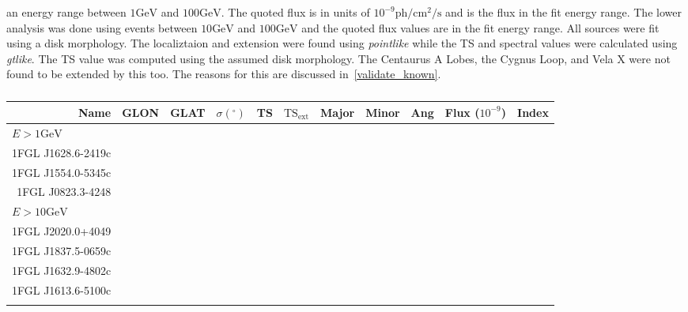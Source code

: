 \documentclass[preprint]{aastex}
\newcommand{\gev}{\text{GeV}\xspace}
\newcommand{\s}{\text{s}\xspace}
\newcommand{\ph}{\text{ph}\xspace}
\newcommand{\cm}{\text{cm}\xspace}
\newcommand{\tsext}{\ensuremath{\text{TS}_\text{ext}}\xspace}
\newcommand{\pointlike}{{\em pointlike}\xspace}
\newcommand{\gtlike}{{\em gtlike}\xspace}
\begin{document}
\begin{table}
\begin{centering}
{      an energy range between $1\gev$ and $100\gev$.
      The quoted flux is in units of $10^{-9}\ph/\cm^2/\s$ and 
      is the flux in the fit energy range.
      The lower analysis was done using events between
      $10\gev$ and $100\gev$ and the quoted flux
      values are in the fit energy range. All sources were
      fit using a disk morphology. The localiztaion and extension
      were found using \pointlike while the TS and spectral
      values were calculated using \gtlike.
      The TS value was computed using 
      the assumed disk morphology. The Centaurus A Lobes,
      the Cygnus Loop, and Vela X were not found to be extended by
      this too. The reasons for this are discussed in~\ref{validate_known}.
      }
    \end{centering}
\end{table}


\clearpage

\begin{table}
    \begin{centering}
      \begin{tabular}{rrrrrrrrrrr}
        Name           &    GLON &    GLAT & $\sigma(^\circ)$ &      TS & $\tsext$ & Major & Minor & Ang & Flux ($10^{-9}$) & Index \\
        \hline
        \multicolumn{11}{l}{$E > 1\gev$} \\
        \hline
        1FGL J1628.6-2419c \\
        1FGL J1554.0-5345c \\
        1FGL J0823.3-4248 \\
        \hline
        \multicolumn{11}{l}{$E > 10\gev$} \\
        \hline
        1FGL J2020.0+4049 \\
        1FGL J1837.5-0659c \\
        1FGL J1632.9-4802c \\
        1FGL J1613.6-5100c \\
        \hline
      \label{new_ext_srcs}
      \end{tabular}
      \caption{}
    \end{centering}
\end{table}
\end{document}
